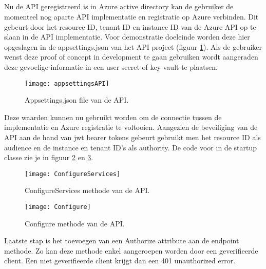 \subsection{}
Nu de API geregistreerd is in Azure active directory kan de gebruiker de momenteel nog aparte API implementatie en registratie op Azure verbinden. Dit gebeurt door het resource ID, tenant ID en instance ID van de Azure API op te slaan in de API implementatie. Voor demonstratie doeleinde worden deze hier opgeslagen in de appsettings.json van het API project (figuur \ref{fig:appsetAPI}). Als de gebruiker wenst deze proof of concept in development te gaan gebruiken wordt aangeraden deze gevoelige informatie in een user secret of key vault te plaatsen.
\begin{figure}[H]
	\centering
	\texttt{[image: appsettingsAPI]} 
	\caption[Appsetingsjosn]{Appsettings.json file van de API.}
	\label{fig:appsetAPI}
\end{figure}
Deze waarden kunnen nu gebruikt worden om de connectie tussen de implementatie en Azure registratie te voltooien. Aangezien de beveiliging van de API aan de hand van jwt bearer tokens gebeurt gebruikt men het resource ID als audience en de instance en tenant ID’s als authority. De code voor in de startup classe zie je in figuur \ref{fig:configureServices} en \ref{fig:configure}. 
\begin{figure}[H]
	\centering
	\texttt{[image: ConfigureServices]} 
	\caption[ConfigureServices]{ConfigureServices methode van de API.}
	\label{fig:configureServices}
\end{figure}\newpage
\begin{figure}[H]
	\centering
	\texttt{[image: Configure]} 
	\caption[Configure]{Configure methode van de API.}
	\label{fig:configure}
\end{figure}
Laatste stap is het toevoegen van een Authorize attribute aan de endpoint methode. Zo kan deze methode enkel aangeroepen worden door een geverifieerde client. Een niet geverifieerde client krijgt dan een 401 unauthorized error.
